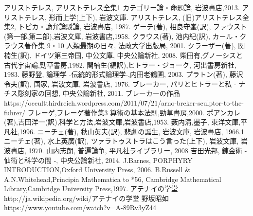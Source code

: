 \documentclass[b5j,8pt,twocolumn]{ltjsarticle}
\begin{document}
\begin{thebibliography}{99}
アリストテレス, アリストテレス全集1 カテゴリー論・命題論, 岩波書店,2013.
アリストテレス, 形而上学(上下), 岩波文庫.
アリストテレス, (旧)アリストテレス全集2, トピカ・詭弁論駁論, 岩波書店, 1987.
ゲーテ(著), 相良守峯(訳), ファウスト(第一部,第二部),岩波文庫, 岩波書店,1958.
クラウス(著), 池内紀(訳), 
カール・クラウス著作集 9・10 人類最期の日々, 法政大学出版局, 2001.
クラーザー(著), 関楠生(訳), ドイツ第三帝国, 中公文庫, 中央公論新社, 2008.
柴田有,グノーシスと古代宇宙論,勁草書房,1982.
関楠生(編訳),ヒトラー・ジョーク, 河出書房新社, 1983.
藤野登, 論理学 -伝統的形式論理学-,内田老鶴圃, 2003.
プラトン(著), 藤沢 令夫(訳), 国家, 岩波文庫, 岩波書店, 1976.
ブレーカー, パリとヒトラーと私 - ナチス彫刻家の回想, 中央公論新社, 2011.
ブレーカーの作品\\
https://occultthirdreich.wordpress.com/2011/07/21/arno-breker-sculptor-to-the-fuhrer/
フレーゲ,フレーゲ著作集3 算術の基本法則,勁草書房,2000.
ポアンカレ(著),吉田洋一(訳),科学と方法,岩波文庫,岩波書店,1953. 
薮内清,墨子, 東洋文庫,平凡社,1996.
ニーチェ(著), 秋山英夫(訳), 悲劇の誕生, 岩波文庫, 岩波書店, 1966.1
ニーチェ(著), 水上英廣(訳), ツァラトゥストラはこう言った(上下), 
岩波文庫, 岩波書店, 1970.
山内志朗, 普遍論争, 平凡社ライブラリー, 2008
吉田光邦, 錬金術 - 仙術と科学の間 -, 中央公論新社, 2014.
J.Barnes, PORPHYRY INTRODUCTION,Oxford University Press, 2006.
B.Russell \& A.N.Whitehead,Principia Mathematica to *56,
Cambridge Mathematical Library,Cambridge University Press,1997.
アテナイの学堂\\ 
http://ja.wikipedia.org/wiki/アテナイの学堂
野坂昭如
https://www.youtube.com/watch?v=A-89Rv3yZ44
\end{thebibliography}
\end{document}
